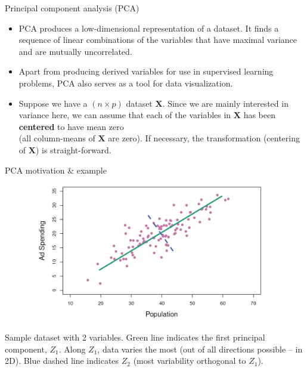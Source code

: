 \documentclass{beamer}
\begin{document}
\begin{frame}{Principal component analysis (PCA)}
\begin{itemize}
\item PCA produces a low-dimensional representation of a dataset. It finds a sequence of linear combinations of the variables that have maximal variance and are mutually uncorrelated.
\bigskip
\item Apart from producing derived variables for use in supervised learning problems, PCA also serves as a tool for data visualization.
\medskip
\item Suppose we have a $(n \! \times \! p)$ dataset $\bm{X}$. Since we are mainly interested in variance here, we can assume that each of the variables in $\bm{X}$ has been \textbf{centered} to have mean zero \\(all column-means of $\bm{X}$ are zero). If necessary, the transformation (centering of $\bm{X}$) is straight-forward.

\end{itemize}
\end{frame}
\begin{frame}{PCA motivation \& example}
\vspace{-0.3cm}
\begin{figure}
\includegraphics[scale=0.30]{IMG/PCAexample.jpg}
\end{figure}
\vspace{-0.3cm}
\centering Sample dataset with 2 variables. Green line indicates the first principal component, $Z_1$. Along $Z_1$, data varies the most (out of all directions possible -- in 2D). Blue dashed line indicates $Z_2$ (most variability orthogonal to $Z_1$).
\end{frame}
\end{document}
